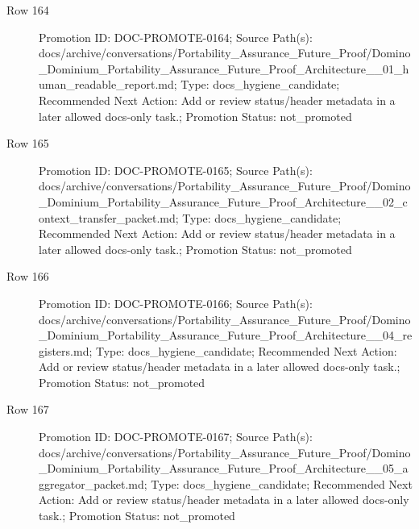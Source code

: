 \documentclass[9pt,a4paper,openany]{book}
\begin{document}
\begin{description}
\item[Row 164] Promotion ID: DOC-\allowbreak{}PROMOTE-\allowbreak{}0164; Source Path(s): docs/\allowbreak{}archive/\allowbreak{}conversations/\allowbreak{}Portability\_\allowbreak{}Assurance\_\allowbreak{}Future\_\allowbreak{}Proof/\allowbreak{}Domino\_\allowbreak{}Dominium\_\allowbreak{}Portability\_\allowbreak{}Assurance\_\allowbreak{}Future\_\allowbreak{}Proof\_\allowbreak{}Architecture\_\allowbreak{}\_\allowbreak{}01\_\allowbreak{}human\_\allowbreak{}readable\_\allowbreak{}report.\allowbreak{}md; Type: docs\_\allowbreak{}hygiene\_\allowbreak{}candidate; Recommended Next Action: Add or review status/\allowbreak{}header metadata in a later allowed docs-\allowbreak{}only task.\allowbreak{}; Promotion Status: not\_\allowbreak{}promoted
\item[Row 165] Promotion ID: DOC-\allowbreak{}PROMOTE-\allowbreak{}0165; Source Path(s): docs/\allowbreak{}archive/\allowbreak{}conversations/\allowbreak{}Portability\_\allowbreak{}Assurance\_\allowbreak{}Future\_\allowbreak{}Proof/\allowbreak{}Domino\_\allowbreak{}Dominium\_\allowbreak{}Portability\_\allowbreak{}Assurance\_\allowbreak{}Future\_\allowbreak{}Proof\_\allowbreak{}Architecture\_\allowbreak{}\_\allowbreak{}02\_\allowbreak{}context\_\allowbreak{}transfer\_\allowbreak{}packet.\allowbreak{}md; Type: docs\_\allowbreak{}hygiene\_\allowbreak{}candidate; Recommended Next Action: Add or review status/\allowbreak{}header metadata in a later allowed docs-\allowbreak{}only task.\allowbreak{}; Promotion Status: not\_\allowbreak{}promoted
\item[Row 166] Promotion ID: DOC-\allowbreak{}PROMOTE-\allowbreak{}0166; Source Path(s): docs/\allowbreak{}archive/\allowbreak{}conversations/\allowbreak{}Portability\_\allowbreak{}Assurance\_\allowbreak{}Future\_\allowbreak{}Proof/\allowbreak{}Domino\_\allowbreak{}Dominium\_\allowbreak{}Portability\_\allowbreak{}Assurance\_\allowbreak{}Future\_\allowbreak{}Proof\_\allowbreak{}Architecture\_\allowbreak{}\_\allowbreak{}04\_\allowbreak{}registers.\allowbreak{}md; Type: docs\_\allowbreak{}hygiene\_\allowbreak{}candidate; Recommended Next Action: Add or review status/\allowbreak{}header metadata in a later allowed docs-\allowbreak{}only task.\allowbreak{}; Promotion Status: not\_\allowbreak{}promoted
\item[Row 167] Promotion ID: DOC-\allowbreak{}PROMOTE-\allowbreak{}0167; Source Path(s): docs/\allowbreak{}archive/\allowbreak{}conversations/\allowbreak{}Portability\_\allowbreak{}Assurance\_\allowbreak{}Future\_\allowbreak{}Proof/\allowbreak{}Domino\_\allowbreak{}Dominium\_\allowbreak{}Portability\_\allowbreak{}Assurance\_\allowbreak{}Future\_\allowbreak{}Proof\_\allowbreak{}Architecture\_\allowbreak{}\_\allowbreak{}05\_\allowbreak{}aggregator\_\allowbreak{}packet.\allowbreak{}md; Type: docs\_\allowbreak{}hygiene\_\allowbreak{}candidate; Recommended Next Action: Add or review status/\allowbreak{}header metadata in a later allowed docs-\allowbreak{}only task.\allowbreak{}; Promotion Status: not\_\allowbreak{}promoted

\end{description}
\end{document}
